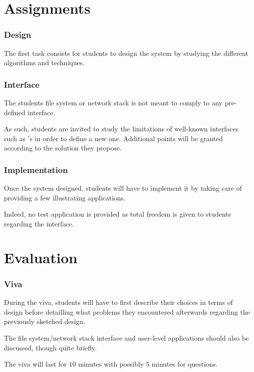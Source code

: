 %
%

\section{Assignments}


\begin{frame}
  \frametitle{Design}

  The first task consists for students to design the system by studying
  the different algorithms and techniques.
\end{frame}


\begin{frame}
  \frametitle{Interface}

  The students file system or network stack is not meant to comply to any
  pre-defined interface.

  \-

  As such, students are invited to study the limitations of well-known
  interfaces such as 's in order to define a new one. Additional
  points will be granted according to the solution they propose.
\end{frame}


\begin{frame}
  \frametitle{Implementation}

  Once the system designed, students will have to implement it by
  taking care of providing a few illustrating applications.

  \-

  Indeed, no test application is provided as total freedom is given to
  students regarding the interface.
\end{frame}

%
%

\section{Evaluation}


\begin{frame}
  \frametitle{Viva}

  During the viva, students will have to first describe their choices in
  terms of design before detailling what problems they encountered afterwards
  regarding the previously sketched design.

  \-

  The file system/network stack interface and user-level applications should
  also be discussed, though quite briefly.

  \-

  The viva will last for $10$ minutes with possibly $5$ minutes for questions.
\end{frame}

